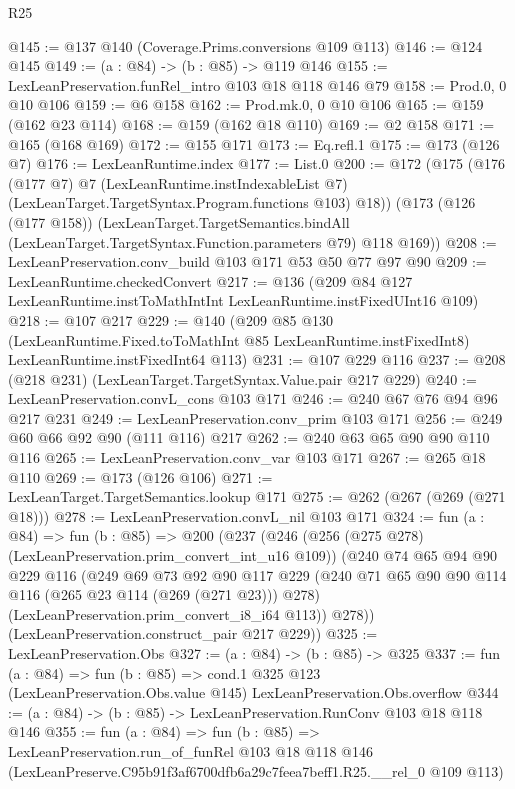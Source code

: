 \begin{lexlean}{R25}
\begin{coremodule}
@145 := @137 @140 (Coverage.Prims.conversions @109 @113)
@146 := @124 @145
@149 := (a : @84) -> (b : @85) -> @119 @146
@155 := LexLeanPreservation.funRel_intro @103 @18 @118 @146 @79
@158 := Prod.{0, 0} @10 @106
@159 := @6 @158
@162 := Prod.mk.{0, 0} @10 @106
@165 := @159 (@162 @23 @114)
@168 := @159 (@162 @18 @110)
@169 := @2 @158
@171 := @165 (@168 @169)
@172 := @155 @171
@173 := Eq.refl.{1}
@175 := @173 (@126 @7)
@176 := LexLeanRuntime.index
@177 := List.{0}
@200 := @172
    (@175
      (@176
        (@177 @7)
        @7
        (LexLeanRuntime.instIndexableList @7)
        (LexLeanTarget.TargetSyntax.Program.functions @103)
        @18))
    (@173
      (@126 (@177 @158))
      (LexLeanTarget.TargetSemantics.bindAll
        (LexLeanTarget.TargetSyntax.Function.parameters @79)
        @118
        @169))
@208 := LexLeanPreservation.conv_build @103 @171 @53 @50 @77 @97 @90
@209 := LexLeanRuntime.checkedConvert
@217 := @136 (@209 @84 @127 LexLeanRuntime.instToMathIntInt LexLeanRuntime.instFixedUInt16 @109)
@218 := @107 @217
@229 := @140
    (@209
      @85
      @130
      (LexLeanRuntime.Fixed.toToMathInt @85 LexLeanRuntime.instFixedInt8)
      LexLeanRuntime.instFixedInt64
      @113)
@231 := @107 @229 @116
@237 := @208 (@218 @231) (LexLeanTarget.TargetSyntax.Value.pair @217 @229)
@240 := LexLeanPreservation.convL_cons @103 @171
@246 := @240 @67 @76 @94 @96 @217 @231
@249 := LexLeanPreservation.conv_prim @103 @171
@256 := @249 @60 @66 @92 @90 (@111 @116) @217
@262 := @240 @63 @65 @90 @90 @110 @116
@265 := LexLeanPreservation.conv_var @103 @171
@267 := @265 @18 @110
@269 := @173 (@126 @106)
@271 := LexLeanTarget.TargetSemantics.lookup @171
@275 := @262 (@267 (@269 (@271 @18)))
@278 := LexLeanPreservation.convL_nil @103 @171
@324 := fun (a : @84) =>
  fun (b : @85) =>
  @200
    (@237
      (@246
        (@256 (@275 @278) (LexLeanPreservation.prim_convert_int_u16 @109))
        (@240
          @74
          @65
          @94
          @90
          @229
          @116
          (@249
            @69
            @73
            @92
            @90
            @117
            @229
            (@240 @71 @65 @90 @90 @114 @116 (@265 @23 @114 (@269 (@271 @23))) @278)
            (LexLeanPreservation.prim_convert_i8_i64 @113))
          @278))
      (LexLeanPreservation.construct_pair @217 @229))
@325 := LexLeanPreservation.Obs
@327 := (a : @84) -> (b : @85) -> @325
@337 := fun (a : @84) =>
  fun (b : @85) =>
  cond.{1} @325 @123 (LexLeanPreservation.Obs.value @145) LexLeanPreservation.Obs.overflow
@344 := (a : @84) -> (b : @85) -> LexLeanPreservation.RunConv @103 @18 @118 @146
@355 := fun (a : @84) =>
  fun (b : @85) =>
  LexLeanPreservation.run_of_funRel
    @103
    @18
    @118
    @146
    (LexLeanPreserve.C95b91f3af6700dfb6a29c7feea7beff1.R25.__rel_0 @109 @113)
\end{coremodule}
\end{lexlean}
